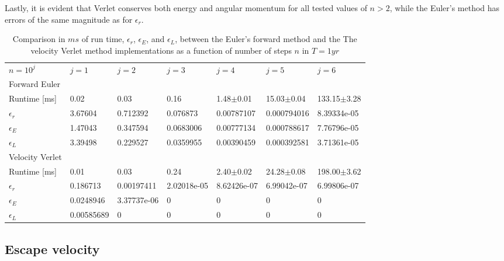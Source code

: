 \documentclass[%
oneside,                 %
final,                   %
10pt]{article}
\begin{document}
Lastly, it is evident that Verlet conserves both energy and angular momentum for all tested values of $n>2$, while the Euler's method has errors of the same magnitude as for $\epsilon_r$.

   
\begin{table}[h]
\begin{tabular}{lllllll}
$n=10^j$         & $j=1$      & $j=2$       & $j=3$       & $j=4$         & $j=5$          & $j=6$           \\
Forward Euler    &            &             &             &               &                &                 \\
Runtime {[}ms{]} & 0.02       & 0.03        & 0.16        & 1.48$\pm$0.01 & 15.03$\pm$0.04 & 133.15$\pm$3.28 \\
$\epsilon_r$     & 3.67604    & 0.712392    & 0.076873    & 0.00787107    & 0.000794016    & 8.39334e-05     \\
$\epsilon_E$     & 1.47043    & 0.347594    & 0.0683006   & 0.00777134    & 0.000788617    & 7.76796e-05     \\
$\epsilon_L$     & 3.39498    & 0.229527    & 0.0359955   & 0.00390459    & 0.000392581    & 3.71361e-05     \\
Velocity Verlet  &            &             &             &               &                &                 \\
Runtime {[}ms{]} & 0.01       & 0.03        & 0.24        & 2.40$\pm$0.02 & 24.28$\pm$0.08 & 198.00$\pm$3.62 \\
$\epsilon_r$     & 0.186713   & 0.00197411  & 2.02018e-05 & 8.62426e-07   & 6.99042e-07    & 6.99806e-07     \\
$\epsilon_E$     & 0.0248946  & 3.37737e-06 & 0           & 0             & 0              & 0               \\
$\epsilon_L$     & 0.00585689 & 0           & 0           & 0             & 0              & 0              
\end{tabular}
\caption{Comparison in $ms$ of run time, $\epsilon_r$, $\epsilon_E$, and $\epsilon_L$, between the Euler's forward method and the The velocity Verlet method implementations as a function of number of steps $n$ in $T=1 yr$}
\label{tab:EulerVsVerlet}
\end{table}
    
 
\subsection{Escape velocity}
\end{document}
